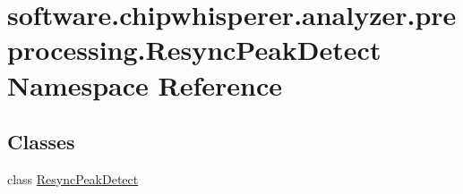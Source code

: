 \hypertarget{namespacesoftware_1_1chipwhisperer_1_1analyzer_1_1preprocessing_1_1ResyncPeakDetect}{}\section{software.\+chipwhisperer.\+analyzer.\+preprocessing.\+Resync\+Peak\+Detect Namespace Reference}
\label{namespacesoftware_1_1chipwhisperer_1_1analyzer_1_1preprocessing_1_1ResyncPeakDetect}
\subsection*{Classes}
\begin{DoxyCompactItemize}
\item 
class \hyperlink{classsoftware_1_1chipwhisperer_1_1analyzer_1_1preprocessing_1_1ResyncPeakDetect_1_1ResyncPeakDetect}{Resync\+Peak\+Detect}
\end{DoxyCompactItemize}
